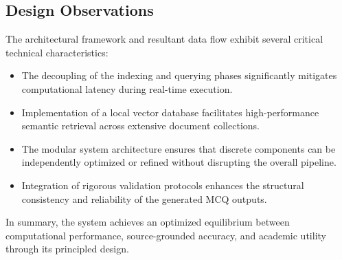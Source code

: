 \documentclass[12pt,a4paper]{report}
\begin{document}
\subsection{Design Observations}
The architectural framework and resultant data flow exhibit several critical technical characteristics:
\begin{itemize}
\item The decoupling of the indexing and querying phases significantly mitigates computational latency during real-time execution.
\item Implementation of a local vector database facilitates high-performance semantic retrieval across extensive document collections.
\item The modular system architecture ensures that discrete components can be independently optimized or refined without disrupting the overall pipeline.
\item Integration of rigorous validation protocols enhances the structural consistency and reliability of the generated MCQ outputs.
\end{itemize}
In summary, the system achieves an optimized equilibrium between computational performance, source-grounded accuracy, and academic utility through its principled design.
\end{document}
